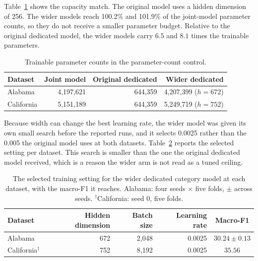 Table~\ref{tab:apx-parameter-counts} shows the capacity match. The original model
uses a hidden dimension of 256. The wider models reach 100.2\% and 101.9\% of the
joint-model parameter counts, so they do not receive a smaller parameter budget. Relative to the
original dedicated model, the wider models carry $6.5$ and $8.1$ times the trainable parameters.

\begin{table}[H]
    \centering
    \caption{Trainable parameter counts in the parameter-count control.}
    \label{tab:apx-parameter-counts}
    \begin{tabular}{lrrr}
        \toprule
        Dataset & Joint model & Original dedicated & Wider dedicated \\
        \midrule
        Alabama    & 4,197,621 & 644,359 & 4,207,399 ($h=672$) \\
        California & 5,151,189 & 644,359 & 5,249,719 ($h=752$) \\
        \bottomrule
    \end{tabular}
\end{table}

Because width can change the best learning rate, the wider model was given its own small search
before the reported runs, and it selects 0.0025 rather than the 0.005 the original model uses at
both datasets. Table~\ref{tab:apx-parameter-arms} reports the selected setting per dataset. This
search is smaller than the one the original dedicated model received, which is a reason the wider
arm is not read as a tuned ceiling.

\begin{table}[H]
    \centering
    \caption{The selected training setting for the wider dedicated category model at each dataset,
    with the macro-F1 it reaches. Alabama: four seeds $\times$ five folds, $\pm$ across seeds.
    $^{\dagger}$California: seed 0, five folds.}
    \label{tab:apx-parameter-arms}
    \begin{tabular}{lrrrc}
        \toprule
        Dataset & Hidden dimension & Batch size & Learning rate & Macro-F1 \\
        \midrule
        Alabama                 & 672 & 2,048 & 0.0025 & $30.24 \pm 0.13$ \\
        California$^{\dagger}$  & 752 & 8,192 & 0.0025 & $35.56$ \\
        \bottomrule
    \end{tabular}
\end{table}


